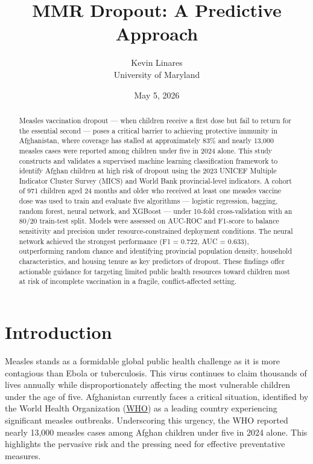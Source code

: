 \documentclass[
  12pt]{article}
\begin{document}
\def\spacingset#1{\renewcommand{\baselinestretch}%
{#1}\small\normalsize} \spacingset{1}



\date{May 5, 2026}
\title{\bf MMR Dropout: A Predictive Approach}
\author{
Kevin Linares\\
University of Maryland\\
}
\maketitle

\bigskip
\bigskip
\begin{abstract}
Measles vaccination dropout --- when children receive a first dose but
fail to return for the essential second --- poses a critical barrier to
achieving protective immunity in Afghanistan, where coverage has stalled
at approximately 83\% and nearly 13,000 measles cases were reported
among children under five in 2024 alone. This study constructs and
validates a supervised machine learning classification framework to
identify Afghan children at high risk of dropout using the 2023 UNICEF
Multiple Indicator Cluster Survey (MICS) and World Bank provincial-level
indicators. A cohort of 971 children aged 24 months and older who
received at least one measles vaccine dose was used to train and
evaluate five algorithms --- logistic regression, bagging, random
forest, neural network, and XGBoost --- under 10-fold cross-validation
with an 80/20 train-test split. Models were assessed on AUC-ROC and
F1-score to balance sensitivity and precision under resource-constrained
deployment conditions. The neural network achieved the strongest
performance (F1 = 0.722, AUC = 0.633), outperforming random chance and
identifying provincial population density, household characteristics,
and housing tenure as key predictors of dropout. These findings offer
actionable guidance for targeting limited public health resources toward
children most at risk of incomplete vaccination in a fragile,
conflict-affected setting.
\end{abstract}


\newpage
\spacingset{1.9} %


\section{Introduction}\label{sec-intro}

Measles stands as a formidable global public health challenge as it is
more contagious than Ebola or tuberculosis. This virus continues to
claim thousands of lives annually while disproportionately affecting the
most vulnerable children under the age of five. Afghanistan currently
faces a critical situation, identified by the World Health Organization
(\href{https://www.emro.who.int/images/stories/afghanistan/Outbreak-Situation-Report-Week-14-2024.pdf}{WHO})
as a leading country experiencing significant measles outbreaks.
Underscoring this urgency, the WHO reported nearly 13,000 measles cases
among Afghan children under five in 2024 alone. This highlights the
pervasive risk and the pressing need for effective preventative
measures.
\end{document}
